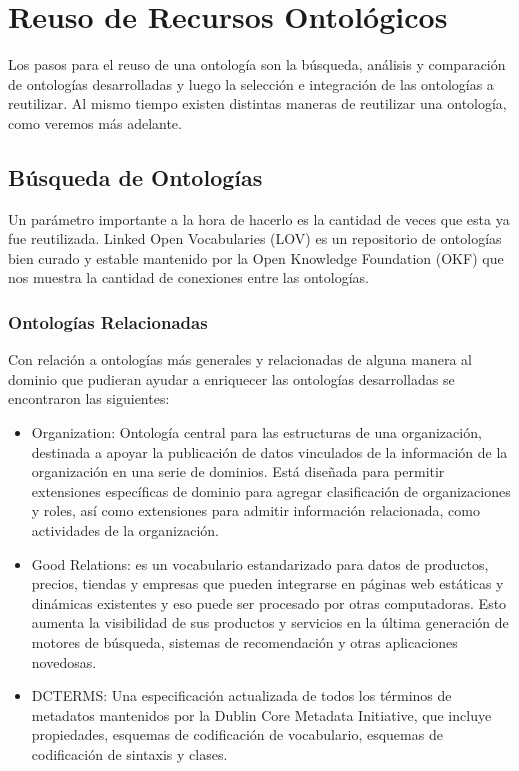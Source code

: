 
\section{Reuso de Recursos Ontológicos}
Los pasos para el reuso de una ontología son la búsqueda, análisis y comparación de ontologías desarrolladas y luego la selección e integración de las ontologías a reutilizar. Al mismo tiempo existen distintas maneras de reutilizar una ontología, como veremos más adelante. 

\subsection{Búsqueda de Ontologías}

Un parámetro importante a la hora de hacerlo es la cantidad de veces que esta ya fue reutilizada. Linked Open Vocabularies (LOV) es un repositorio de ontologías bien curado y estable mantenido por la Open Knowledge Foundation (OKF) que nos muestra la cantidad de conexiones entre las ontologías.

\subsubsection{Ontologías Relacionadas}

Con relación a ontologías más generales y relacionadas de alguna manera al dominio que pudieran ayudar a enriquecer las ontologías desarrolladas se encontraron las siguientes:
\begin{itemize}
    \item Organization: Ontología central para las estructuras de una organización, destinada a apoyar la publicación de datos vinculados de la información de la organización en una serie de dominios. Está diseñada para permitir extensiones específicas de dominio para agregar clasificación de organizaciones y roles, así como extensiones para admitir información relacionada, como actividades de la organización.
    \item Good Relations: es un vocabulario estandarizado para datos de productos, precios, tiendas y empresas que pueden integrarse en páginas web estáticas y dinámicas existentes y eso puede ser procesado por otras computadoras. Esto aumenta la visibilidad de sus productos y servicios en la última generación de motores de búsqueda, sistemas de recomendación y otras aplicaciones novedosas.
    \item DCTERMS: Una especificación actualizada de todos los términos de metadatos mantenidos por la Dublin Core Metadata Initiative, que incluye propiedades, esquemas de codificación de vocabulario, esquemas de codificación de sintaxis y clases. 
\end{itemize}

